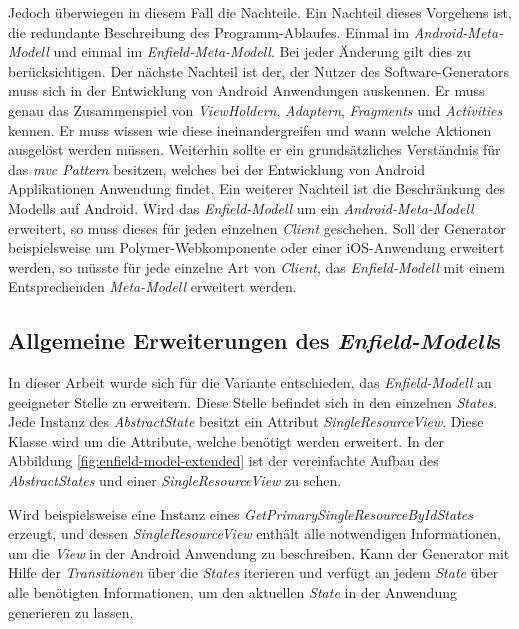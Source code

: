 Jedoch überwiegen in diesem Fall die Nachteile. Ein Nachteil dieses Vorgehens ist, die redundante Beschreibung des Programm-Ablaufes. Einmal im \textit{Android-Meta-Modell} und einmal im \textit{Enfield-Meta-Modell}. Bei jeder Änderung gilt dies zu berücksichtigen. 
Der nächste Nachteil ist der, der Nutzer des Software-Generators muss sich in der Entwicklung von Android Anwendungen auskennen. Er muss genau das Zusammenspiel von \textit{ViewHoldern}, \textit{Adaptern}, \textit{Fragments} und \textit{Activities} kennen. Er muss wissen wie diese ineinandergreifen und wann welche Aktionen ausgelöst werden müssen. Weiterhin sollte er ein grundsätzliches Verständnis für das \textit{\acf{mvc} Pattern} besitzen, welches bei der Entwicklung von Android Applikationen Anwendung findet.
Ein weiterer Nachteil ist die Beschränkung des Modells auf Android. Wird das \textit{Enfield-Modell} um ein \textit{Android-Meta-Modell} erweitert, so muss dieses für jeden einzelnen \textit{Client} geschehen. Soll der Generator beispielsweise um Polymer-Webkomponente oder einer iOS-Anwendung erweitert werden, so müsste für jede einzelne Art von \textit{Client}, das \textit{Enfield-Modell} mit einem Entsprechenden \textit{Meta-Modell} erweitert werden.

\subsection{Allgemeine Erweiterungen des \textit{Enfield-Modell}s}

In dieser Arbeit wurde sich für die Variante entschieden, das \textit{Enfield-Modell} an geeigneter Stelle zu erweitern.
Diese Stelle befindet sich in den einzelnen \textit{States}. Jede Instanz des \textit{AbstractState} besitzt ein Attribut \textit{SingleResourceView}. Diese Klasse wird um die  Attribute, welche benötigt werden erweitert. In der Abbildung \ref{fig:enfield-model-extended} ist der vereinfachte Aufbau des \textit{AbstractStates} und einer \textit{SingleResourceView} zu sehen.

Wird beispielsweise eine Instanz eines \textit{GetPrimarySingleResourceByIdStates} erzeugt, und dessen \textit{SingleResourceView} enthält alle notwendigen Informationen, um die \textit{View} in der Android Anwendung zu beschreiben. Kann der Generator mit Hilfe der \textit{Transitionen} über die \textit{States} iterieren und verfügt an jedem \textit{State} über alle benötigten Informationen, um den aktuellen \textit{State} in der Anwendung generieren zu lassen.

\newpage

